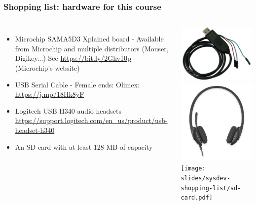 \begin{frame}
\frametitle{Shopping list: hardware for this course}
  \begin{columns}
    \footnotesize
    \begin{itemize}
      \item Microchip SAMA5D3 Xplained board - Available from Microchip and
 	    multiple distributors (Mouser, Digikey...)
	    See \url{https://bit.ly/2Ghv10p} (Microchip's website)
      \item USB Serial Cable - Female ends:
	    Olimex: \url{https://j.mp/18Hk8yF} \\
      \item Logitech USB H340 audio headsets
	    \url{https://support.logitech.com/en_us/product/usb-headset-h340}
      \item An SD card with at least 128 MB of capacity
    \end{itemize}
    \includegraphics[height=0.20\textheight]{slides/sysdev-shopping-list/usb-serial-cable-female.png} \\
    \includegraphics[height=0.15\textheight]{slides/sysdev-shopping-list/logitech-h340.png} \\
    \texttt{[image: slides/sysdev-shopping-list/sd-card.pdf]}
  \end{columns}
\end{frame}
